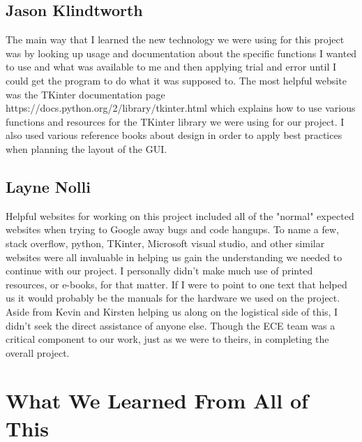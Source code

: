 \documentclass[10pt,draftclsnofoot,onecolumn,retainorgcmds]{IEEEtran}
\begin{document}
\subsection{Jason Klindtworth}
The main way that I learned the new technology we were using for this project was by looking up usage and documentation about the specific functions I wanted to use and what was available to me and then applying trial and error until I could get the program to do what it was supposed to. The most helpful website was the TKinter documentation page https://docs.python.org/2/library/tkinter.html which explains how to use various functions and resources for the TKinter library we were using for our project. I also used various reference books about design in order to apply best practices when planning the layout of the GUI.

\subsection{Layne Nolli}
Helpful websites for working on this project included all of the "normal" expected websites when trying to Google away bugs and code hangups. To name a few, stack overflow, python, TKinter, Microsoft visual studio, and other similar websites were all invaluable in helping us gain the understanding we needed to continue with our project. I personally didn't make much use of printed resources, or e-books, for that matter. If I were to point to one text that helped us it would probably be the manuals for the hardware we used on the project. Aside from Kevin and Kirsten helping us along on the logistical side of this, I didn't seek the direct assistance of anyone else. Though the ECE team was a critical component to our work, just as we were to theirs, in completing the overall project. \par

\section{What We Learned From All of This}
\end{document}
